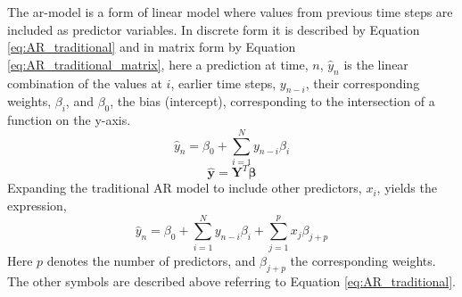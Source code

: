 The \acrshort{ar}-model is a form of linear model where values from previous time steps are included as predictor variables. In discrete form it is described by Equation \eqref{eq:AR_traditional} and in matrix form by Equation \eqref{eq:AR_traditional_matrix}, here a prediction at time, $n$, $\hat{y}_n$ is the linear combination of the values at $i$, earlier time steps, $y_{n-i}$, their corresponding weights, $\beta_i$, and $\beta_0$, the bias (intercept), corresponding to the intersection of a function on the y-axis. 
\begin{equation} \label{eq:AR_traditional}
    \hat{y}_n = \beta_0 + \sum_{i = 1}^{N} y_{n-i} \beta_{i}
\end{equation}
\begin{equation} \label{eq:AR_traditional_matrix}
    \hat{\mathbf{y}} = \mathbf{Y}^T \mathbf{\beta}
\end{equation}
Expanding the traditional AR model to include other predictors, $x_i$, yields the expression,
\begin{equation} \label{eq:AR_expression}
    \hat{y}_n = \beta_0 + \sum_{i = 1}^{N} y_{n-i}\beta_{i}+ \sum_{j=1}^p x_j\beta_{j+p}
\end{equation}
Here $p$ denotes the number of predictors, and $\beta_{j+p}$ the corresponding weights. The other symbols are described above referring to Equation \eqref{eq:AR_traditional}. 


